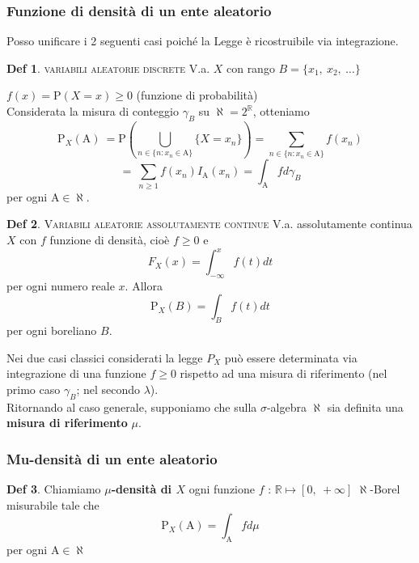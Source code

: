 \documentclass[a4paper,11pt]{article}
\theoremstyle{plain}
\theoremstyle{definition}
\newtheorem{defn}{Def}[section]
\theoremstyle{remark}
\begin{document}
\subsubsection{Funzione di densità di un ente aleatorio}
Posso unificare i 2 seguenti casi poiché la Legge è ricostruibile via integrazione.

\begin{defn}  \textsc{variabili aleatorie discrete} V.a. $X$ con rango $B=\{x_{1},\ x_{2},\ \ldots\}$

$f(x)=\mathrm{P}(X=x)\geq 0$ (funzione di probabilità)\\
\noindent
Considerata la misura di conteggio $\gamma_{B}$ su $\aleph=2^{\mathbb{R}}$, otteniamo
$$
\mathrm{P}_{X}(\mathrm{A})\ =\mathrm{P}(\bigcup_{n\in\{n:x_{n}\in \mathrm{A}\}}\{X=x_{n}\})=\sum_{n\in\{n:x_{n}\in \mathrm{A}\}}f(x_{n})
$$
$$
=\ \sum_{n\geq 1}f(x_{n})I_{\mathrm{A}}(x_{n})=\int_{\mathrm{A}}fd\gamma_{B}
$$
per ogni $\mathrm{A}\in\aleph.$\\

\end{defn}

\begin{defn} \textsc{Variabili aleatorie assolutamente continue} V.a. assolutamente continua $X$ con $f$ funzione di densità, cioè $f\geq 0$ e
$$
F_{X}(x)=\int_{-\infty}^{x}f(t)dt
$$
per ogni numero reale $x$. Allora
$$
\mathrm{P}_{X}(B)=\int_{B}f(t)dt
$$
per ogni boreliano $B.$
\end{defn}

\noindent
Nei due casi classici considerati la legge $P_X$ può essere determinata via integrazione di una funzione $f\geq 0$ rispetto ad una misura di riferimento (nel primo caso $\gamma_B$; nel secondo $\lambda$).\\


\noindent
Ritornando al caso generale, supponiamo che sulla $\sigma$-algebra $\aleph$ sia definita una\textbf{ misura di riferimento} $\mu.$

\subsubsection{Mu-densità di un ente aleatorio}
\begin{defn} Chiamiamo \textbf{$\mu$-\textbf{densità} di $X$} ogni funzione $f$ :  $\mathbb{R} \mapsto[0,\ +\infty]$  $\aleph$-Borel misurabile tale che
$$
\mathrm{P}_{X}(\mathrm{A})=\int_{\mathrm{A}}fd\mu
$$
per ogni $\mathrm{A}\in\aleph$
\end{defn}
\end{document}
